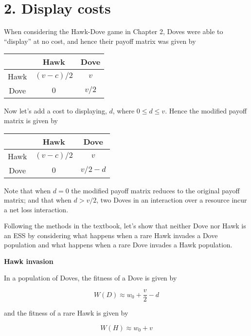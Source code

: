 \documentclass{article}
\begin{document}
\section*{2. Display costs}

When considering the Hawk-Dove game in Chapter 2, Doves were able to
``display'' at no cost, and hence their payoff matrix was given by

\begin{center}
\begin{tabular}{ccc}
    & Hawk & Dove \\
    \hline
    Hawk & $(v - c) / 2$ & $v$ \\
    Dove & $0$ & $v / 2$ \\
    \hline
\end{tabular}
\end{center}

Now let's add a cost to displaying, $d$, where $0 \leq d \leq v$. Hence
the modified payoff matrix is given by

\begin{center}
\begin{tabular}{ccc}
    & Hawk & Dove \\
    \hline
    Hawk & $(v - c) / 2$ & $v$ \\
    Dove & $0$ & $v / 2 - d$ \\
    \hline
\end{tabular}
\end{center}

Note that when $d = 0$ the modified payoff matrix reduces to the
original payoff matrix; and that when $d > v / 2$, two Doves in an
interaction over a resource incur a net loss interaction.

Following the methods in the textbook, let's show that neither Dove nor
Hawk is an ESS by considering what happens when a rare Hawk invades a
Dove population and what happens when a rare Dove invades a Hawk
population.

\textbf{Hawk invasion}

In a population of Doves, the fitness of a Dove is given by

\begin{equation*}
    W(D) \approx w_0 + \frac{v}{2} - d
\end{equation*}

and the fitness of a rare Hawk is given by

\begin{equation*}
    W(H) \approx w_0 + v
\end{equation*}
\end{document}
